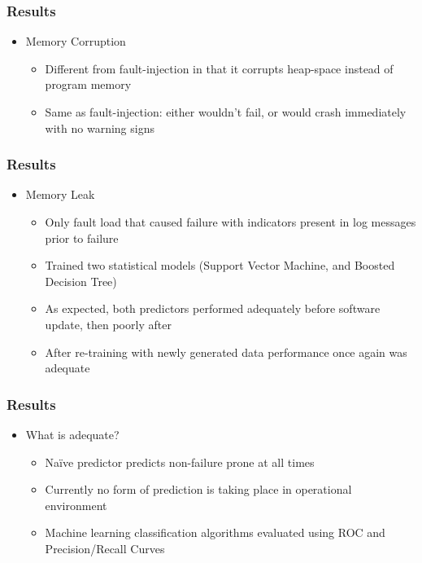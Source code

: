\documentclass[aspectratio=169]{beamer}
\begin{document}
\begin{frame}
  \frametitle{Results}
  \begin{itemize}
  \item{Memory Corruption}
    \begin{itemize}
    \item{Different from fault-injection in that it corrupts heap-space instead
    of program memory}
    \item{Same as fault-injection: either wouldn't fail, or would crash
    immediately with no warning signs}
    \end{itemize}
  \end{itemize}
\end{frame}


\begin{frame}
  \frametitle{Results}
  \begin{itemize}
  \item{Memory Leak}
    \begin{itemize}
    \item{Only fault load that caused failure with indicators present in log
    messages prior to failure}
    \item{Trained two statistical models (Support Vector Machine, and Boosted
    Decision Tree)}
    \item{As expected, both predictors performed adequately before software
    update, then poorly after}
    \item{After re-training with newly generated data performance once again
    was adequate}
    \end{itemize}
  \end{itemize}
\end{frame}


\begin{frame}
  \frametitle{Results}
  \begin{itemize}
  \item{What is adequate?}
    \begin{itemize}
    \item{Na{\"i}ve predictor predicts non-failure prone at all times}
    \item{Currently no form of prediction is taking place in operational
    environment}
    \item{Machine learning classification algorithms evaluated using ROC and
    Precision/Recall Curves~\cite{salfnerSurvey,islr}}
    \end{itemize}
  \end{itemize}
\end{frame}
\end{document}
